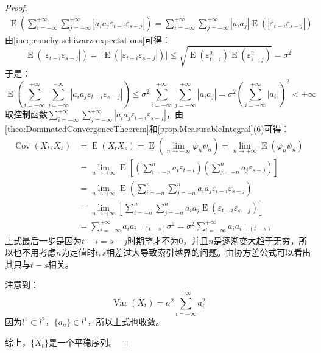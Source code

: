 \begin{proof}
\begin{align*}
		\operatorname{E}\left(\sum_{i=-\infty}^{+\infty}\sum_{j=-\infty}^{+\infty}|a_ia_j\varepsilon_{t-i}\varepsilon_{s-j}|\right)=\sum_{i=-\infty}^{+\infty}\sum_{j=-\infty}^{+\infty}|a_ia_j|\operatorname{E}(|\varepsilon_{t-i}\varepsilon_{s-j}|)
	\end{align*}
	由\cref{ineq:cauchy-schiwarz-expectations}可得：
	\begin{equation*}
		\operatorname{E}(|\varepsilon_{t-i}\varepsilon_{s-j}|)=\Big|\operatorname{E}(|\varepsilon_{t-i}\varepsilon_{s-j}|)\Big|\leqslant\sqrt{\operatorname{E}(\varepsilon_{t-i}^2)\operatorname{E}(\varepsilon_{s-j}^2)}=\sigma^2
	\end{equation*}
	于是：
	\begin{equation*}
		\operatorname{E}\left(\sum_{i=-\infty}^{+\infty}\sum_{j=-\infty}^{+\infty}|a_ia_j\varepsilon_{t-i}\varepsilon_{s-j}|\right)\leqslant\sigma^2\sum_{i=-\infty}^{+\infty}\sum_{j=-\infty}^{+\infty}|a_ia_j|=\sigma^2\left(\sum_{i=-\infty}^{+\infty}|a_i|\right)^2<+\infty
	\end{equation*}
	取控制函数$\sum\limits_{i=-\infty}^{+\infty}\sum\limits_{j=-\infty}^{+\infty}|a_ia_j\varepsilon_{t-i}\varepsilon_{s-j}|$，由\cref{theo:DominatedConvergenceTheorem}和\cref{prop:MeasurableIntegral}(6)可得：
	\begin{align*}
		\operatorname{Cov}(X_t,X_s)&=\operatorname{E}(X_tX_s)=\operatorname{E}\left(\lim_{n\to+\infty}\varphi_n\psi_n\right)=\lim_{n\to+\infty}\operatorname{E}(\varphi_n\psi_n) \\
		&=\lim_{n\to+\infty}\operatorname{E}\left[\left(\sum_{i=-n}^{n}a_i\varepsilon_{t-i}\right)\left(\sum_{j=-n}^{n}a_j\varepsilon_{s-j}\right)\right] \\
		&=\lim_{n\to+\infty}\operatorname{E}\left(\sum_{i=-n}^{n}\sum_{j=-n}^{n}a_ia_j\varepsilon_{t-i}\varepsilon_{s-j}\right) \\
		&=\lim_{n\to+\infty}\left[\sum_{i=-n}^{n}\sum_{j=-n}^{n}a_ia_j\operatorname{E}(\varepsilon_{t-i}\varepsilon_{s-j})\right] \\
		&=\sum_{i=-\infty}^{+\infty}a_ia_{i-(t-s)}\sigma^2=\sigma^2\sum_{i=-\infty}^{+\infty}a_ia_{i+(t-s)}
	\end{align*}
	上式最后一步是因为$t-i=s-j$时期望才不为$0$，并且$n$是逐渐变大趋于无穷，所以也不用考虑$n$为定值时$t,s$相差过大导致索引越界的问题。由协方差公式可以看出其只与$t-s$相关。\par
	注意到：
	\begin{equation*}
		\operatorname{Var}(X_t)=\sigma^2\sum_{i=-\infty}^{+\infty}a_i^2
	\end{equation*}
	因为$l^1\subset l^2$，$\{a_n\}\in l^1$，所以上式也收敛。\par
	综上，$\{X_t\}$是一个平稳序列。
\end{proof}
